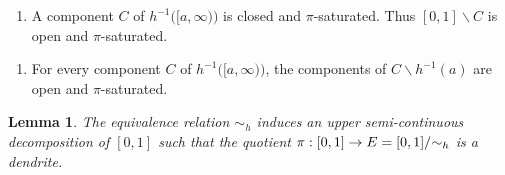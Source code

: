 \documentclass[11pt, leqno]{amsart}
\newtheorem{lemma}[theorem]{Lemma}
\theoremstyle{definition}\newtheorem{definition}[theorem]{Definition}
\begin{document}
    \begin{enumerate}
        
    \item[(*)]A component $C$ of $h^{-1}\big([a,\infty)\big)$ is closed and $\pi$-saturated.  Thus $[0,1]\backslash C$ is open and $\pi$-saturated.
    \end{enumerate}  
    
     \begin{enumerate}
        \item[(**)]For every component $C$ of $h^{-1}\big([a,\infty)\big)$, the components of $C\backslash h^{-1}(a)$ are open and $\pi$-saturated.
    \end{enumerate} 
    


\begin{lemma}\label{lem: build denrite}
    The equivalence relation $\sim_h$ induces an upper semi-continuous decomposition of $[0,1]$ such that the quotient $\pi: [0,1]\to E=[0,1]/\hspace{-.25em}\sim_h$ is a dendrite.  
\end{lemma}
\end{document}
